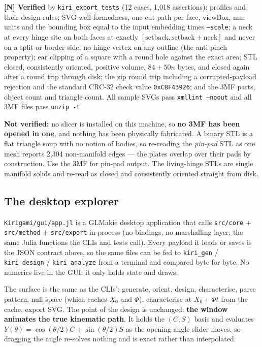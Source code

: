 \documentclass[11pt,a4paper]{article}
\theoremstyle{definition}
\newcommand{\file}[1]{\texttt{\small #1}}
\begin{document}
\textbf{[N] Verified} by \file{kiri\_export\_tests} (12 cases, 1{,}018 assertions): profiles
and their design rules; SVG well-formedness, one cut path per face, viewBox, mm units and the
bounding box equal to the input embedding times \file{--scale}; a neck at every hinge site on
both faces at exactly $[\text{setback},\text{setback}+\text{neck}]$ and never on a split or
border side; no hinge vertex on any outline (the anti-pinch property); ear clipping of a square
with a round hole against the exact area; STL closed, consistently oriented, positive volume,
$84+50n$ bytes, and closed again after a round trip through disk; the zip round trip including
a corrupted-payload rejection and the standard CRC-32 check value \texttt{0xCBF43926}; and the
3MF parts, object count and triangle count. All sample SVGs pass \file{xmllint --noout} and
all 3MF files pass \file{unzip -t}.

\textbf{Not verified:} no slicer is installed on this machine, so \textbf{no 3MF has been
opened in one}, and nothing has been physically fabricated. A binary STL is a flat triangle
soup with no notion of bodies, so re-reading the \emph{pin-pad} STL as one mesh reports
2{,}304 non-manifold edges --- the plates overlap over their pads by construction. Use the 3MF
for pin-pad output. The living-hinge STLs are single manifold solids and re-read as closed and
consistently oriented straight from disk.

\subsection{The desktop explorer}

\file{Kirigami/gui/app.jl} is a GLMakie desktop application that calls \file{src/core} $+$
\file{src/method} $+$ \file{src/export} in-process (no bindings, no marshalling layer; the same
Julia functions the CLIs and tests call). Every payload it loads or saves is the JSON contract
above, so the same files can be fed to \file{kiri\_gen} / \file{kiri\_design} /
\file{kiri\_analyze} from a terminal and compared byte for byte. No numerics live in the GUI:
it only holds state and draws.

The surface is the same as the CLIs': generate, orient, design, characterise,
parse pattern, null space (which caches $X_0$ and $\Phi$), characterise at $X_0+\Phi t$ from the
cache, export SVG. The point of the design is unchanged: \textbf{the window animates the true
kinematic path}. It holds the $(C,S)$ basis and evaluates $Y(\theta)=\cos(\theta/2)C+\sin(\theta/2)S$
as the opening-angle slider moves, so dragging the angle re-solves nothing and is exact rather
than interpolated.
\end{document}

